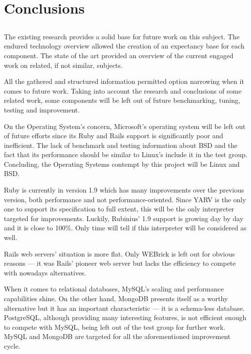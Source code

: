\chapter{Conclusions} %
\label{cha:conclusions}
\section*{} %
The existing research provides a solid base for future work on this subject. The endured technology overview allowed the creation of an expectancy base for each component. The state of the art provided an overview of the current engaged work on related, if not similar, subjects.

All the gathered and structured information permitted option narrowing when it comes to future work. Taking into account the research and conclusions of some related work, some components will be left out of future benchmarking, tuning, testing and improvement.

On the Operating System's concern, Microsoft's operating system will be left out of future efforts since its Ruby and Rails support is significantly poor and inefficient. The lack of benchmark and testing information about BSD and the fact that its performance should be similar to Linux's include it in the test group. Concluding, the Operating Systems contempt by this project will be Linux and BSD.

Ruby is currently in version 1.9 which has many improvements over the previous version, both performance and not performance-oriented. Since YARV is the only one to support its specification to full extent, this will be the only interpreter targeted for improvements. Luckily, Rubinius' 1.9 support is growing day by day and it is close to 100\%. Only time will tell if this interpreter will be considered as well.

Rails web servers' situation is more flat. Only WEBrick is left out for obvious reasons --- it was Rails' pioneer web server but lacks the efficiency to compete with nowadays alternatives.

When it comes to relational databases, MySQL's scaling and performance capabilities shine. On the other hand, MongoDB presents itself as a worthy alternative but it has an important characteristic --- it is a schema-less database. PostgreSQL, although providing many interesting features, is not efficient enough to compete with MySQL, being left out of the test group for further work. MySQL and MongoDB are targeted for all the aforementioned improvement cycle.

